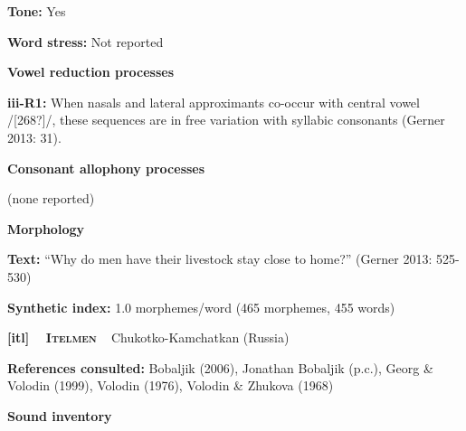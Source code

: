 \begin{styleBody}
\textbf{Tone: }Yes
\end{styleBody}

\begin{styleBody}
\textbf{Word stress: }Not reported
\end{styleBody}

\begin{styleBody}
\textbf{Vowel reduction processes}
\end{styleBody}

\begin{styleBody}
\textbf{iii-R1:} When nasals and lateral approximants co-occur with central vowel /[268?]/, these sequences are in free variation with syllabic consonants (Gerner 2013: 31).
\end{styleBody}

\begin{styleBody}
\textbf{Consonant allophony processes}
\end{styleBody}

\begin{styleBody}
(none reported)
\end{styleBody}

\begin{styleBody}
\textbf{Morphology}
\end{styleBody}

\begin{styleBody}
\textbf{Text:} “Why do men have their livestock stay close to home?” (Gerner 2013: 525-530)
\end{styleBody}

\begin{styleBody}
\textbf{Synthetic index: }1.0 morphemes/word (465 morphemes, 455 words)
\end{styleBody}

\clearpage\begin{styleBody}
\textbf{[itl] }\ \ \textbf{\textsc{Itelmen}}\textbf{\ \ }Chukotko-Kamchatkan (Russia)
\end{styleBody}

\begin{styleBody}
\textbf{References consulted:} Bobaljik (2006), Jonathan Bobaljik (p.c.), Georg \& Volodin (1999), Volodin (1976), Volodin \& Zhukova (1968)
\end{styleBody}

\begin{styleBody}
\textbf{Sound inventory}
\end{styleBody}

